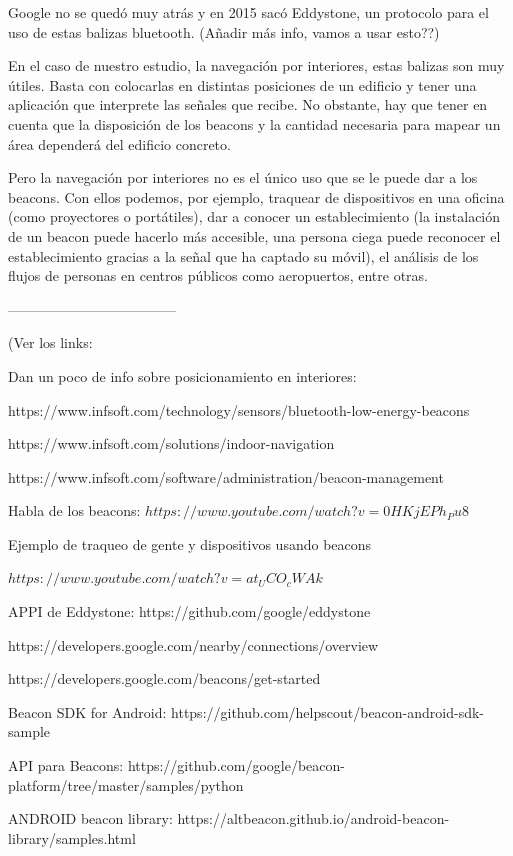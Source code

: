 Google no se quedó muy atrás y en 2015 sacó Eddystone, un protocolo para el uso de estas balizas bluetooth. (Añadir más info, vamos a usar esto??)

En el caso de nuestro estudio, la navegación por interiores, estas balizas son muy útiles. Basta con colocarlas en distintas posiciones de un edificio y tener una aplicación que interprete las señales que recibe. No obstante, hay que tener en cuenta que la disposición de los beacons y la cantidad necesaria para mapear un área dependerá del edificio concreto.


Pero la navegación por interiores no es el único uso que se le puede dar a los beacons. Con ellos podemos, por ejemplo, traquear de dispositivos en una oficina (como proyectores o portátiles), dar a conocer un establecimiento (la instalación de un beacon puede hacerlo más accesible, una persona ciega puede reconocer el establecimiento gracias a la señal que ha captado su móvil), el análisis de los flujos de personas en centros públicos como aeropuertos, entre otras. 

------------------------------------

(Ver los links: 

Dan un poco de info sobre posicionamiento en interiores:


https://www.infsoft.com/technology/sensors/bluetooth-low-energy-beacons

https://www.infsoft.com/solutions/indoor-navigation

https://www.infsoft.com/software/administration/beacon-management

Habla de los beacons:
$ https://www.youtube.com/watch?v=0HKjEPh_Pu8 $

Ejemplo de traqueo de gente y dispositivos usando beacons 

$ https://www.youtube.com/watch?v=at_UCO_cWAk $

APPI de Eddystone:
https://github.com/google/eddystone

https://developers.google.com/nearby/connections/overview

https://developers.google.com/beacons/get-started

Beacon SDK for Android: https://github.com/helpscout/beacon-android-sdk-sample

API para Beacons: https://github.com/google/beacon-platform/tree/master/samples/python

ANDROID beacon library: https://altbeacon.github.io/android-beacon-library/samples.html

